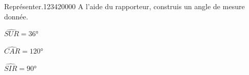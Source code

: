 \begin{pageAD}
\begin{ExoCad}{Représenter.}{1234}{2}{0}{0}{0}{0}
A l'aide du rapporteur, construis un angle de mesure donnée.

\begin{minipage}{0.32\linewidth}
\begin{center}
$\widehat{SUR}= 36$°
\end{center}
\vspace{5cm}
 

\end{minipage}
\vrule
\begin{minipage}{0.32\linewidth}

\begin{center}
$\widehat{CAR}= 120$°
\end{center}
  \vspace{5cm}
\end{minipage}  
\vrule
\begin{minipage}{0.32\linewidth}
 
 
\begin{center}
$\widehat{SIR}= 90$°
\end{center}\vspace{5cm}
\end{minipage}
 \end{ExoCad}


\end{pageAD}


